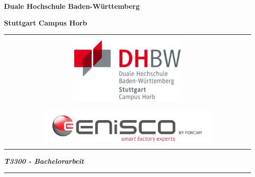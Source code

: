 \titlepage
\begin{center}
    \textbf{\large{}Duale Hochschule Baden-Württemberg }{\large\par}
    \par
\end{center}
\begin{center}
    \textbf{\large{}Stuttgart Campus Horb}{\large\par}
    \par
\end{center}
\begin{center}
    \begin{tabular}{l||r}
        \multicolumn{2}{c}{\vspace{1cm}}
        \tabularnewline
        \multicolumn{2}{c}{\includegraphics[height=3.5cm]{images/dhbwlogo}}
        \tabularnewline
        \multicolumn{2}{c}{}
        \tabularnewline
        \multicolumn{2}{c}{\includegraphics[width=0.7\textwidth, scale=1]{images/ENiscobyForcamLogo.png}}
        \tabularnewline
        \multicolumn{2}{c}{\vspace{1cm}}
        \tabularnewline
    \end{tabular}
    \par
\end{center}
\vspace{0.5cm}

\begin{flushleft}
    \textbf{\Large{}\title{}}{\Large\par}
    \par
\end{flushleft}

\begin{flushleft}
    \textbf{\textit{T3300 - Bachelorarbeit}}
    \par
\end{flushleft}

\begin{flushleft}
    {\Large{}\rule[0.5ex]{1\columnwidth}{1pt}}{\Large\par}
    \par
\end{flushleft}

